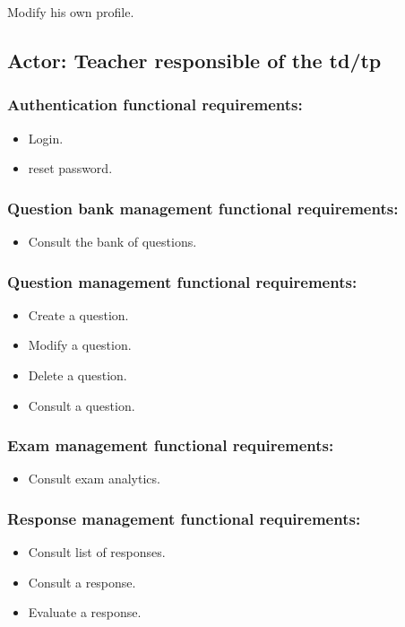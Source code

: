 \documentclass[a4paper,12p]{article}
\begin{document}
        \item Modify his own profile.


     \subsection{Actor: Teacher responsible of the td/tp}
     \subsubsection{Authentication functional requirements:}
     \begin{itemize}
         \item Login.
         \item reset password.
     \end{itemize}

     \subsubsection{Question bank management functional requirements:}
     \begin{itemize}
         \item Consult the bank of questions.
     \end{itemize}

     \subsubsection{Question management functional requirements:}
     \begin{itemize}
         \item Create a question.
         \item Modify a question.
         \item Delete a question.
         \item Consult a question.
     \end{itemize}

     \subsubsection{Exam management functional requirements:}
     \begin{itemize}
         \item Consult exam analytics.
     \end{itemize}

     \subsubsection{Response management functional requirements:}
     \begin{itemize}
         \item Consult list of responses.
         \item Consult a response.
         \item Evaluate a response.
     \end{itemize}
\end{document}
